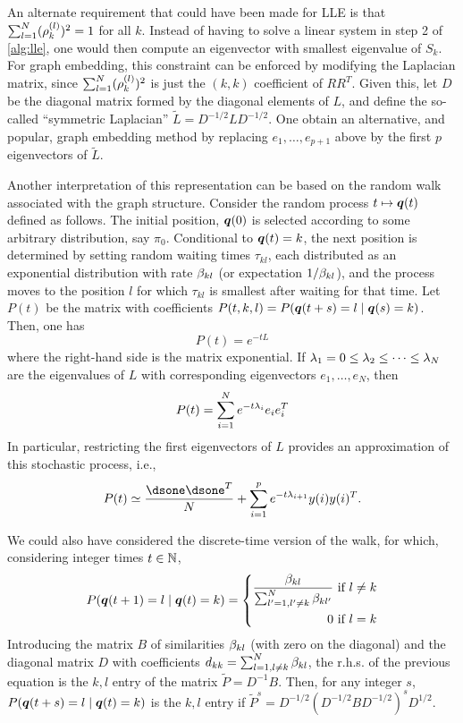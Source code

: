 An alternate requirement that could have been made for LLE is that $\sum_{l=1}^N (\rho_{k}^{(l)})^2 = 1$ for all $k$. Instead of having to solve a linear system in step 2 of \cref{alg:lle}, one would then compute an eigenvector with smallest eigenvalue of $S_k$. For graph embedding, this constraint can be enforced by modifying the Laplacian matrix, since $\sum_{l=1}^N (\rho_{k}^{(l)})^2$ is just the $(k,k)$ coefficient of $RR^T$. Given this, let $D$ be the diagonal matrix formed by the diagonal elements of $L$, and define the so-called ``symmetric Laplacian'' $\tilde L = D^{-1/2} L D^{-1/2}$. One obtain an alternative, and popular, graph embedding method by replacing $e_1, \ldots, e_{p+1}$ above by the first $p$ eigenvectors of $\tilde L$.

\bigskip

Another interpretation of this representation can be based on the random walk associated with the graph structure. Consider the random process $t \mapsto {\bm{q}}(t)$ defined as follows. The initial position, ${\bm{q}}(0)$ is selected according to some arbitrary distribution, say $\pi_0$. Conditional to ${\bm{q}}(t) = k$, the next position is determined by setting random waiting times $\tau_{kl}$, each distributed as an exponential distribution with rate $\beta_{kl}$ (or expectation $1/\beta_{kl}$), and the process moves to the position $l$ for which $\tau_{kl}$ is smallest after waiting for that time. Let  $P(t)$ be the matrix with coefficients $P(t, k, l) = P({\bm{q}}(t+s) = l\mid {\bm{q}}(s) = k)$. Then, one has
\[
P(t) = e^{-t L}
\]
where the right-hand side is the matrix exponential. If $\lambda_1 = 0 \leq \lambda_2 \leq\cdots \leq \lambda_N$ are the eigenvalues of $L$ with corresponding eigenvectors $e_1, \ldots, e_N$, then
\[
P(t) = \sum_{i=1}^N e^{-t\lambda_i} e_ie_i^T
\]
In particular, restricting the first eigenvectors of $L$ provides an approximation of this stochastic process, i.e., 
\[
P(t) \simeq \frac{\dsone\dsone^T}N + \sum_{i=1}^p e^{-t\la_{i+1}} y(i)y(i)^T.
\] 

We could also have considered the discrete-time version of the walk, for which, considering integer times $t\in {\mathbb{N}}$, 
\[
P({\bm{q}}(t+1) = l \mid {\bm{q}}(t) = k) =\left\{
\begin{aligned}
 \frac{\beta_{kl}}{\sum_{l'=1, l'\neq k}^N \beta_{kl'}} \text{ if } l\neq k\\
 0 \text{ if } l=k
 \end{aligned}
 \right.
\]
Introducing the matrix $B$ of similarities $\beta_{kl}$ (with zero on the diagonal) and the diagonal matrix $D$ with coefficients 
$d_{kk} = \sum_{l =1, l\neq k}^N \beta_{kl}$, the r.h.s. of the previous equation is the $k,l$ entry of the matrix $\tilde P = D^{-1} B$. Then, for any integer $s$, $P({\bm{q}}(t+s) = l \mid {\bm{q}}(t) = k)$ is the $k,l$ entry if $\tilde P^s = D^{-1/2} (D^{-1/2} B D^{-1/2})^s D^{1/2}$.

